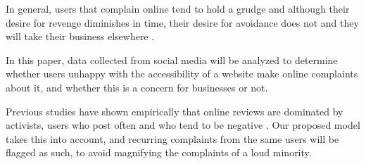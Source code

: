 In general, users that complain online tend to hold a grudge and although their desire
for revenge diminishes in time, their desire for avoidance does not and they will take
their business elsewhere \cite{tripp2011unhappy}.

In this paper, data collected from social media will be analyzed to determine whether
users unhappy with the accessibility of a website make online complaints about it, and
whether this is a concern for businesses or not.

Previous studies have shown empirically that online reviews are dominated by activists,
users who post often and who tend to be negative \cite{moe2012}. Our proposed model
takes this into account, and recurring complaints from the same users will be flagged
as such, to avoid magnifying the complaints of a loud minority.
